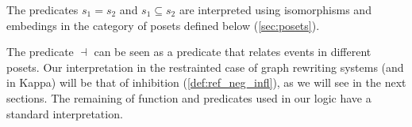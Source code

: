
The predicates $s_1 = s_2$ and $s_1\subseteq s_2$ are interpreted using isomorphisms and embedings in the category of posets defined below (\autoref{sec:posets}).

The predicate $\dashv$ can be seen as a predicate that relates events in different posets. Our interpretation in the restrainted case of graph rewriting systems (and in Kappa) will be that of inhibition (\autoref{def:ref_neg_infl}), as we will see in the next sections. The remaining of function and predicates used in our logic have a standard interpretation.


